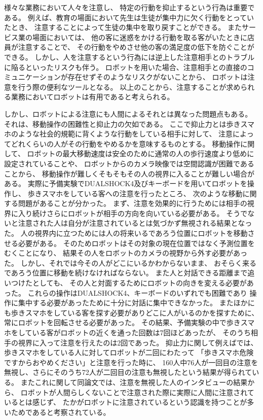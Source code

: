 \documentclass{kuisthesis}
\begin{document}
様々な業務において人々を注意し、
特定の行動を抑止するという行為は重要である。
例えば、教育の場面において先生は生徒が集中力に欠く行動をとっていたとき、
注意することによって生徒の集中を取り戻すことができる。
またサービス業の場面においては、
他の客に迷惑をかける行動を取る客がいたときに店員が注意することで、
その行動をやめさせ他の客の満足度の低下を防ぐことができる。
しかし、人を注意するという行為には逆上した注意相手とのトラブルに陥るといったリスクも伴う。
ロボットを用いた場合、注意相手との直接のコミュニケーションが存在せずそのようなリスクがないことから、
ロボットは注意を行う際の便利なツールとなる。
以上のことから、注意することが求められる業務においてロボットは有用であると考えられる。

しかし、ロボットによる注意にも人間によるそれとは異なった問題点もある。
それは、移動操作の困難性と抑止力の欠如である。
ここで抑止力とは歩きスマホのような社会的規範に背くような行動をしている相手に対して、
注意によってどれくらいの人がその行動をやめるかを意味するものとする。
移動操作に関して、
ロボットの最大移動速度は安全のために通常の人の歩行速度より低めに設定されていることや、
ロボットからのカメラ映像では空間認識が困難であることから、
移動操作が難しくそもそもその人の視界に入ることが難しい場合がある。
実際に予備実験でDUALSHOCK4及びキーボードを用いてロボットを操作し、
歩きスマホをしている客への注意を行ったところ、
次のような移動に関する問題があることが分かった。
まず、注意を効果的に行うためには相手の視界に入り続けさらにロボットが相手の方向を向いている必要がある。
そうでないと注意された人は自分が注意されているとは気づかず無視される結果となった。
人の視界内に立つためには人の将来いるであろう位置にロボットを移動させる必要がある。
そのためロボットはその対象の現在位置ではなく予測位置をむくことになり、
結果その人をロボットのカメラの視野から外す必要があった。
しかし、それでは今その人がどこにいるかわからないまま、
おそらく来るであろう位置に移動を続けなければならない。
また人と対話できる距離まで追いつけたとしても、
その人と対面するためにロボットの向きを変える必要があった。
これらの操作はDUALSHOCK4、キーボードのいずれでも困難であり
操作に集中する必要があったために十分に対話に集中できなかった。
またほかにも歩きスマホをしている客を探す必要がありどこに人がいるのかを探すために、
常にロボットを回転させる必要があった。
その結果、予備実験の中で歩きスマホをしている客がロボットの近くを通った回数は7回ほどあったが、
そのうち相手の視界に入って注意を行えたのは2回であった。
抑止力に関して例えば\cite{Schneider2022}では、歩きスマホをしている人に対してロボットが二回にわたって
「歩きスマホ危険ですからおやめください」と注意を行った時に、
160人中76人が一回目の注意を無視し、さらにそのうち72人が二回目の注意も無視したという結果が得られている。
またこれに関して同論文では、注意を無視した人のインタビューの結果から、
ロボットが人間らしくないことで注意された際に実際に人間に注意されているとは感じず、
たかがロボットに注意されているという認識を持つことが多いためであると考察されている。
\end{document}
